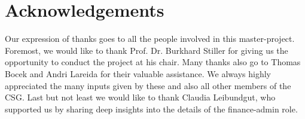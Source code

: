 \chapter*{Acknowledgements}

Our expression of thanks goes to all the people involved in this master-project. Foremost, we would like to thank Prof. Dr. Burkhard Stiller for giving us the opportunity to conduct the project at his chair. Many thanks also go to Thomas Bocek and Andri Lareida for their valuable assistance. We always highly appreciated the many inputs given by these and also all other members of the CSG. Last but not least we would like to thank Claudia Leibundgut, who supported us by sharing deep insights into the details of the finance-admin role.